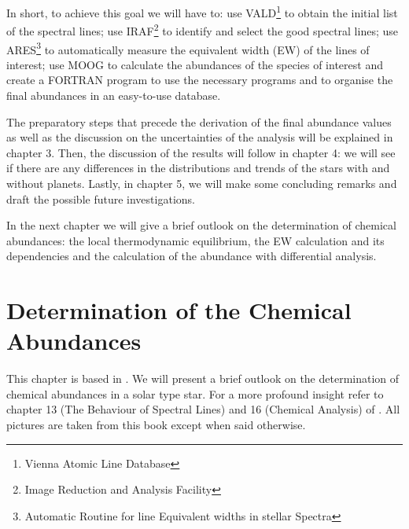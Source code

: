\documentclass[dvips,12pt,a4paper]{report}
\begin{document}
{In short, to achieve this goal we will have to: use VALD\footnote{Vienna Atomic Line Database} to obtain the initial list of the spectral lines; use IRAF\footnote{Image Reduction and Analysis Facility} to identify and select the good spectral lines; use ARES\footnote{Automatic Routine for line Equivalent widths in stellar Spectra} to automatically measure the equivalent width (EW) of the lines of interest; use MOOG \citep{Sneden-1973} to calculate the abundances of the species of interest and create a FORTRAN program to use the necessary programs and to organise the final abundances in an easy-to-use database.

The preparatory steps that precede the derivation of the final abundance values as well as the discussion on the uncertainties of the analysis will be explained in chapter 3. Then, the discussion of the results will follow in chapter 4: we will see if there are any differences in the distributions and trends of the stars with and without planets. Lastly, in chapter 5, we will make some concluding remarks and draft the possible future investigations.

In the next chapter we will give a brief outlook on the determination of chemical abundances: the local thermodynamic equilibrium, the EW calculation and its dependencies and the calculation of the abundance with differential analysis.





\chapter{Determination of the Chemical Abundances}

\indent This chapter is based in \citet{Gray-2005}. We will present a brief outlook on the determination of chemical abundances in a solar type star. For a more profound insight refer to chapter 13 (The Behaviour of Spectral Lines) and 16 (Chemical Analysis) of \citet{Gray-2005}. All pictures are taken from this book except when said otherwise.

}
\end{document}
